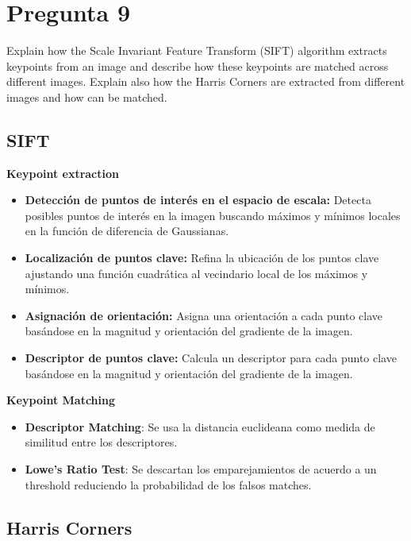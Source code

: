 \documentclass{article}
\begin{document}
\section{Pregunta 9}

Explain how the Scale Invariant Feature Transform (SIFT) algorithm extracts keypoints from an image and describe how these keypoints are matched across different images. Explain also how the Harris Corners are extracted from different images and how can be matched.

\subsection{SIFT}

\textbf{Keypoint extraction}

\begin{itemize}
    \item \textbf{Detección de puntos de interés en el espacio de escala:} Detecta posibles puntos de interés en la imagen buscando máximos y mínimos locales en la función de diferencia de Gaussianas.
    \item \textbf{Localización de puntos clave:} Refina la ubicación de los puntos clave ajustando una función cuadrática al vecindario local de los máximos y mínimos.
    \item \textbf{Asignación de orientación:} Asigna una orientación a cada punto clave basándose en la magnitud y orientación del gradiente de la imagen.
    \item \textbf{Descriptor de puntos clave:} Calcula un descriptor para cada punto clave basándose en la magnitud y orientación del gradiente de la imagen.
\end{itemize}

\textbf{Keypoint Matching}

\begin{itemize}
    \item \textbf{Descriptor Matching}: Se usa la distancia euclideana como medida de similitud entre los descriptores.
    \item \textbf{Lowe's Ratio Test}: Se descartan los emparejamientos de acuerdo a un threshold reduciendo la probabilidad de los falsos matches.
\end{itemize}

\subsection{Harris Corners}
\end{document}
